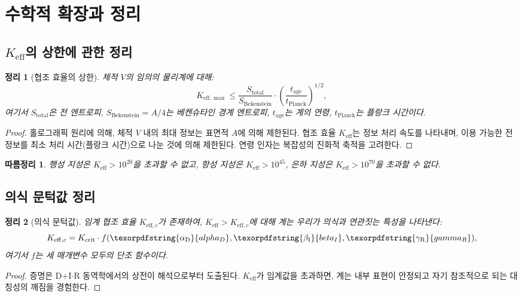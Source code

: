 \documentclass[11pt,a4paper]{article}
\newtheorem{theorem}{정리}
\newtheorem{corollary}{따름정리}
\DeclareRobustCommand{\alD}{\texorpdfstring{\ensuremath{\alpha_{\mathrm{D}}}}{alpha_D}}
\DeclareRobustCommand{\beI}{\texorpdfstring{\ensuremath{\beta_{\mathrm{I}}}}{beta_I}}
\DeclareRobustCommand{\gaR}{\texorpdfstring{\ensuremath{\gamma_{\mathrm{R}}}}{gamma_R}}
\newcommand{\eff}{\mathrm{eff}}
\newcommand{\Ke}{K_{\eff}}
\newcommand{\Kemax}{K_{\eff,\max}}
\newcommand{\Kec}{K_{\eff,c}}
\newcommand{\Kcrit}{K_{\mathrm{crit}}}
\begin{document}
	\section{수학적 확장과 정리}
	
	\subsection{\(\Ke\)의 상한에 관한 정리}
	
	\begin{theorem}[협조 효율의 상한]
		체적 \(V\)의 임의의 물리계에 대해:
		\[
		\Kemax \leq \frac{S_{\mathrm{total}}}{S_{\mathrm{Bekenstein}}} \cdot \left(\frac{t_{\mathrm{age}}}{t_{\mathrm{Planck}}}\right)^{1/2},
		\]
		여기서 \(S_{\mathrm{total}}\)은 전 엔트로피, \(S_{\mathrm{Bekenstein}} = A/4\)는 베켄슈타인 경계 엔트로피, \(t_{\mathrm{age}}\)는 계의 연령, \(t_{\mathrm{Planck}}\)는 플랑크 시간이다.
	\end{theorem}
	
	\begin{proof}
		홀로그래픽 원리에 의해, 체적 \(V\) 내의 최대 정보는 표면적 \(A\)에 의해 제한된다. 협조 효율 \(\Ke\)는 정보 처리 속도를 나타내며, 이용 가능한 전 정보를 최소 처리 시간(플랑크 시간)으로 나눈 것에 의해 제한된다. 연령 인자는 복잡성의 진화적 축적을 고려한다.
	\end{proof}
	
	\begin{corollary}
		행성 지성은 \(\Ke > 10^{20}\)을 초과할 수 없고, 항성 지성은 \(\Ke > 10^{45}\), 은하 지성은 \(\Ke > 10^{70}\)을 초과할 수 없다.
	\end{corollary}
	
	\subsection{의식 문턱값 정리}
	
	\begin{theorem}[의식 문턱값]
		임계 협조 효율 \(K_{\eff,c}\)가 존재하여, \(\Ke > K_{\eff,c}\)에 대해 계는 우리가 의식과 연관짓는 특성을 나타낸다:
		\[
		\Kec = \Kcrit \cdot f(\alD, \beI, \gaR),
		\]
		여기서 \(f\)는 세 매개변수 모두의 단조 함수이다.
	\end{theorem}
	
	\begin{proof}
		증명은 D+I\(\cdot\)R 동역학에서의 상전이 해석으로부터 도출된다. \(\Ke\)가 임계값을 초과하면, 계는 내부 표현이 안정되고 자기 참조적으로 되는 대칭성의 깨짐을 경험한다.
	\end{proof}
	
\end{document}
